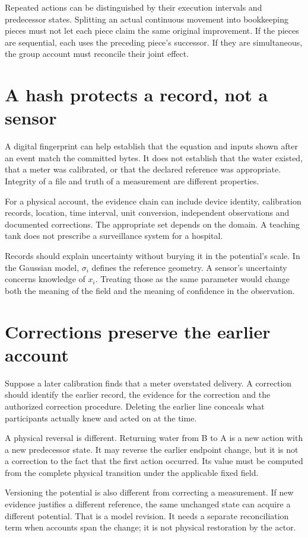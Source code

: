 Repeated actions can be distinguished by their execution intervals and predecessor states. Splitting an actual continuous movement into bookkeeping pieces must not let each piece claim the same original improvement. If the pieces are sequential, each uses the preceding piece's successor. If they are simultaneous, the group account must reconcile their joint effect.

\section{A hash protects a record, not a sensor}
A digital fingerprint can help establish that the equation and inputs shown after an event match the committed bytes. It does not establish that the water existed, that a meter was calibrated, or that the declared reference was appropriate. Integrity of a file and truth of a measurement are different properties.

For a physical account, the evidence chain can include device identity, calibration records, location, time interval, unit conversion, independent observations and documented corrections. The appropriate set depends on the domain. A teaching tank does not prescribe a surveillance system for a hospital.

Records should explain uncertainty without burying it in the potential's scale. In the Gaussian model, $\sigma_i$ defines the reference geometry. A sensor's uncertainty concerns knowledge of $x_i$. Treating those as the same parameter would change both the meaning of the field and the meaning of confidence in the observation.

\section{Corrections preserve the earlier account}
Suppose a later calibration finds that a meter overstated delivery. A correction should identify the earlier record, the evidence for the correction and the authorized correction procedure. Deleting the earlier line conceals what participants actually knew and acted on at the time.

A physical reversal is different. Returning water from B to A is a new action with a new predecessor state. It may reverse the earlier endpoint change, but it is not a correction to the fact that the first action occurred. Its value must be computed from the complete physical transition under the applicable fixed field.

Versioning the potential is also different from correcting a measurement. If new evidence justifies a different reference, the same unchanged state can acquire a different potential. That is a model revision. It needs a separate reconciliation term when accounts span the change; it is not physical restoration by the actor.

